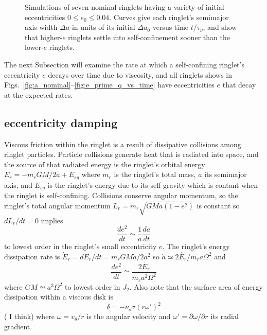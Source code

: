 \documentclass[preprint]{aastex62}
\begin{document}
\begin{figure}
    \caption{
        \label{fig:e0}
        Simulations of seven nominal ringlets having a variety of initial eccentricities $0\le e_0\le 0.04$.
        Curves give each ringlet's semimajor axis width $\Delta a$ in units of its initial $\Delta a_0$
        versus time $t/\tau_\nu$, and show that higher-$e$ ringlets settle into self-confinement
        sooner than the lower-$e$ ringlets.
    }
\end{figure}

The next Subsection will examine the rate at which
a self-confining ringlet's eccentricity $e$ decays over time due to viscosity, 
and all ringlets shows in Figs.\ \ref{fig:a_nominal}--\ref{fig:e_prime_q_vs_time}
have eccentricities $e$ that decay at the expected rates.


\subsection{eccentricity damping}
\label{subsec:eccentricity}

Viscous friction within the ringlet is a result of dissipative collisions among ringlet particles.
Particle collisions generate heat that is radiated into space, and the source of that radiated energy
is the ringlet's orbital energy $E_r=-m_rGM/2a + E_{sg}$ where $m_r$ is the ringlet's total
mass, $a$ its semimajor axis, and $E_{sg}$ is the ringlet's energy due to its self gravity
which is contant when the ringlet is self-confining. 
Collisions conserve angular momentum, so the ringlet's total angular momentum
$L_r=m_r\sqrt{GMa(1-e^2)}$ is constant so $dL_r/dt=0$ implies
\begin{equation}
    \label{eqn:e2-dot}
    \frac{de^2}{dt} \simeq \frac{1}{a}\frac{da}{dt}
\end{equation}
to lowest order in the ringlet's small eccentricity $e$.
The ringlet's energy dissipation rate is $\dot{E}_r = dE_r/dt=m_rGM\dot{a}/2a^2$ so
$\dot{a}\simeq2\dot{E_r}/m_ra\Omega^2$ and 
\begin{equation}
    \label{eqn:de2/dt}
    \frac{de^2}{dt} \simeq \frac{2\dot{E_r}}{m_r a^2\Omega^2}
\end{equation}
where $GM\simeq a^3\Omega^2$ to lowest order in $J_2$. Also note that
the surface area of energy dissipation within a viscous disk is
\begin{equation}
    \delta = -\nu_s\sigma(r\omega')^2
\end{equation}
(\citealt{P81} I think) where $\omega=v_\theta/r$ is the angular velocity and 
$\omega'=\partial\omega/\partial r$ its radial gradient.
\end{document}

